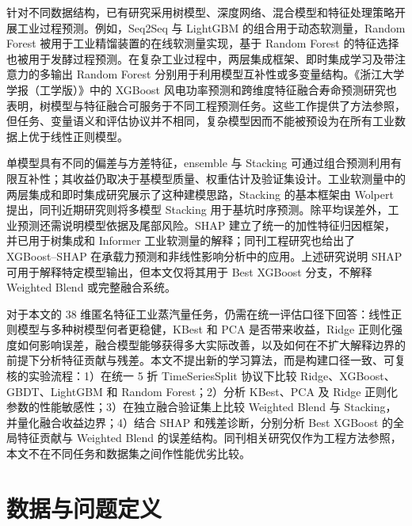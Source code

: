 \documentclass[UTF8,a4paper,twocolumn,zihao=5,fontset=none]{ctexart}
\begin{document}
针对不同数据结构，已有研究采用树模型、深度网络、混合模型和特征处理策略开展工业过程预测。例如，Seq2Seq 与 LightGBM 的组合用于动态软测量\citep{li2020seq2seq_lightgbm}，Random Forest 被用于工业精馏装置的在线软测量实现\citep{botha2021industrial_softsensor}，基于 Random Forest 的特征选择也被用于发酵过程预测\citep{hua2023rf_feature_selection}。在复杂工业过程中，两层集成框架、即时集成学习及带注意力的多输出 Random Forest 分别用于利用模型互补性或多变量结构\citep{wang2019two_layer_ensemble,pan2019ensemble_jit,wan2024wide_rf}。《浙江大学学报（工学版）》中的 XGBoost 风电功率预测和跨维度特征融合寿命预测研究也表明，树模型与特征融合可服务于不同工程预测任务\citep{wang2023zju_wind_xgboost,zhang2025zju_feature_fusion}。这些工作提供了方法参照，但任务、变量语义和评估协议并不相同，复杂模型因而不能被预设为在所有工业数据上优于线性正则模型。

单模型具有不同的偏差与方差特征，ensemble 与 Stacking 可通过组合预测利用有限互补性；其收益仍取决于基模型质量、权重估计及验证集设计。工业软测量中的两层集成和即时集成研究展示了这种建模思路\citep{wang2019two_layer_ensemble,pan2019ensemble_jit}，Stacking 的基本框架由 Wolpert 提出\citep{wolpert1992stacking}，同刊近期研究则将多模型 Stacking 用于基坑时序预测\citep{hu2025zju_stacking}。除平均误差外，工业预测还需说明模型依据及尾部风险。SHAP 建立了统一的加性特征归因框架\citep{lundberg2017shap}，并已用于树集成和 Informer 工业软测量的解释\citep{cao2023interpretable_softsensor,cao2024informer_shap}；同刊工程研究也给出了 XGBoost--SHAP 在承载力预测和非线性影响分析中的应用\citep{chen2023zju_xgboost_shap,lu2025zju_xgboost_shap}。上述研究说明 SHAP 可用于解释特定模型输出，但本文仅将其用于 Best XGBoost 分支，不解释 Weighted Blend 或完整融合系统。

对于本文的 38 维匿名特征工业蒸汽量任务，仍需在统一评估口径下回答：线性正则模型与多种树模型何者更稳健，KBest 和 PCA 是否带来收益，Ridge 正则化强度如何影响误差，融合模型能够获得多大实际改善，以及如何在不扩大解释边界的前提下分析特征贡献与残差。本文不提出新的学习算法，而是构建口径一致、可复核的实验流程：1）在统一 5 折 TimeSeriesSplit 协议下比较 Ridge、XGBoost、GBDT、LightGBM 和 Random Forest；2）分析 KBest、PCA 及 Ridge 正则化参数的性能敏感性；3）在独立融合验证集上比较 Weighted Blend 与 Stacking，并量化融合收益边界；4）结合 SHAP 和残差诊断，分别分析 Best XGBoost 的全局特征贡献与 Weighted Blend 的误差结构。同刊相关研究仅作为工程方法参照\citep{chen2023zju_xgboost_shap,hu2025zju_stacking,zhang2025zju_feature_fusion,lu2025zju_xgboost_shap}，本文不在不同任务和数据集之间作性能优劣比较。

\section{数据与问题定义}
\end{document}
